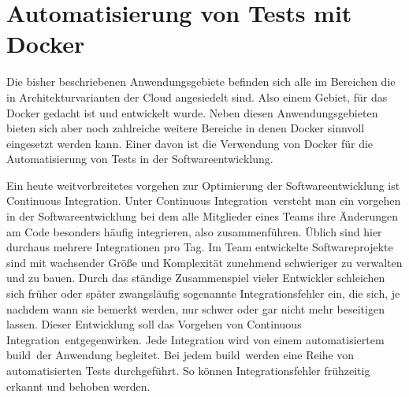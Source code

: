 \section{Automatisierung von Tests mit Docker}
\label{sec:automatisierung_von_tests_mit_docker}

Die bisher beschriebenen Anwendungsgebiete befinden sich alle im Bereichen die in Architekturvarianten der Cloud angesiedelt sind. Also einem Gebiet, für das Docker gedacht ist und entwickelt wurde. Neben diesen Anwendungsgebieten bieten sich aber noch zahlreiche weitere Bereiche in denen Docker sinnvoll eingesetzt werden kann.
Einer davon ist die Verwendung von Docker für die Automatisierung von Tests in der Softwareentwicklung.

Ein heute weitverbreitetes vorgehen zur Optimierung der Softwareentwicklung ist \grq Continuous Integration\grq . Unter \grq Continuous Integration\grq\ versteht man ein vorgehen in der Softwareentwicklung bei dem alle Mitglieder eines Teams ihre Änderungen am Code besonders häufig integrieren, also zusammenführen. Üblich sind hier durchaus mehrere Integrationen pro Tag. 
\glqq Im Team entwickelte Softwareprojekte sind mit wachsender Größe und Komplexität zunehmend schwieriger zu verwalten und zu bauen. Durch das ständige Zusammenspiel vieler Entwickler schleichen sich früher oder später zwangsläufig sogenannte Integrationsfehler ein, die sich, je nachdem wann sie bemerkt werden, nur schwer oder gar nicht mehr beseitigen lassen.\grqq \cite{feustel_continuous_????}
Dieser Entwicklung soll das Vorgehen von \grq Continuous Integration\grq\ entgegenwirken.
Jede Integration wird von einem automatisiertem \grq build\grq\ der Anwendung begleitet. Bei jedem \grq build\grq\ werden eine Reihe von automatisierten Tests durchgeführt. So können Integrationsfehler frühzeitig erkannt und behoben werden.


